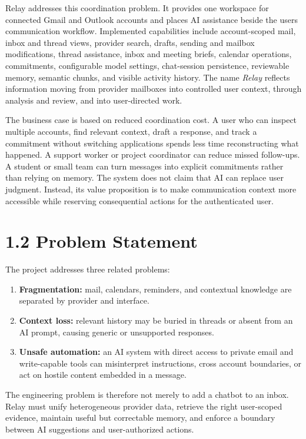 \documentclass[
]{report}
\providecommand{\tightlist}{%
  \setlength{\itemsep}{0pt}\setlength{\parskip}{0pt}}
\begin{document}
Relay addresses this coordination problem. It provides one workspace for
connected Gmail and Outlook accounts and places AI assistance beside the
user\textquotesingle s communication workflow. Implemented capabilities
include account-scoped mail, inbox and thread views, provider search,
drafts, sending and mailbox modifications, thread assistance, inbox and
meeting briefs, calendar operations, commitments, configurable model
settings, chat-session persistence, reviewable memory, semantic chunks,
and visible activity history. The name \emph{Relay} reflects information
moving from provider mailboxes into controlled user context, through
analysis and review, and into user-directed work.

The business case is based on reduced coordination cost. A user who can
inspect multiple accounts, find relevant context, draft a response, and
track a commitment without switching applications spends less time
reconstructing what happened. A support worker or project coordinator
can reduce missed follow-ups. A student or small team can turn messages
into explicit commitments rather than relying on memory. The system does
not claim that AI can replace user judgment. Instead, its value
proposition is to make communication context more accessible while
reserving consequential actions for the authenticated user.

\section{1.2 Problem Statement}\label{12-problem-statement}

The project addresses three related problems:

\begin{enumerate}
\def\labelenumi{\arabic{enumi}.}
\tightlist
\item
  \textbf{Fragmentation:} mail, calendars, reminders, and contextual
  knowledge are separated by provider and interface.
\item
  \textbf{Context loss:} relevant history may be buried in threads or
  absent from an AI prompt, causing generic or unsupported responses.
\item
  \textbf{Unsafe automation:} an AI system with direct access to private
  email and write-capable tools can misinterpret instructions, cross
  account boundaries, or act on hostile content embedded in a message.
\end{enumerate}

The engineering problem is therefore not merely to add a chatbot to an
inbox. Relay must unify heterogeneous provider data, retrieve the right
user-scoped evidence, maintain useful but correctable memory, and
enforce a boundary between AI suggestions and user-authorized actions.
\end{document}
